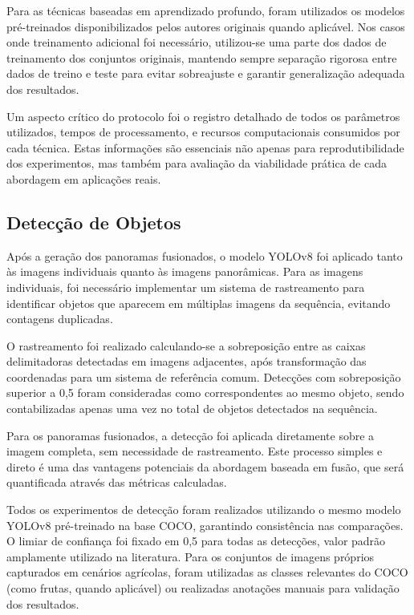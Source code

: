 Para as técnicas baseadas em aprendizado profundo, foram utilizados os modelos pré-treinados disponibilizados pelos autores originais quando aplicável. Nos casos onde treinamento adicional foi necessário, utilizou-se uma parte dos dados de treinamento dos conjuntos originais, mantendo sempre separação rigorosa entre dados de treino e teste para evitar sobreajuste e garantir generalização adequada dos resultados.

Um aspecto crítico do protocolo foi o registro detalhado de todos os parâmetros utilizados, tempos de processamento, e recursos computacionais consumidos por cada técnica. Estas informações são essenciais não apenas para reprodutibilidade dos experimentos, mas também para avaliação da viabilidade prática de cada abordagem em aplicações reais.

\subsection{Detecção de Objetos}

Após a geração dos panoramas fusionados, o modelo YOLOv8 foi aplicado tanto às imagens individuais quanto às imagens panorâmicas. Para as imagens individuais, foi necessário implementar um sistema de rastreamento para identificar objetos que aparecem em múltiplas imagens da sequência, evitando contagens duplicadas.

O rastreamento foi realizado calculando-se a sobreposição entre as caixas delimitadoras detectadas em imagens adjacentes, após transformação das coordenadas para um sistema de referência comum. Detecções com sobreposição superior a 0,5 foram consideradas como correspondentes ao mesmo objeto, sendo contabilizadas apenas uma vez no total de objetos detectados na sequência.

Para os panoramas fusionados, a detecção foi aplicada diretamente sobre a imagem completa, sem necessidade de rastreamento. Este processo simples e direto é uma das vantagens potenciais da abordagem baseada em fusão, que será quantificada através das métricas calculadas.

Todos os experimentos de detecção foram realizados utilizando o mesmo modelo YOLOv8 pré-treinado na base COCO, garantindo consistência nas comparações. O limiar de confiança foi fixado em 0,5 para todas as detecções, valor padrão amplamente utilizado na literatura. Para os conjuntos de imagens próprios capturados em cenários agrícolas, foram utilizadas as classes relevantes do COCO (como frutas, quando aplicável) ou realizadas anotações manuais para validação dos resultados.

